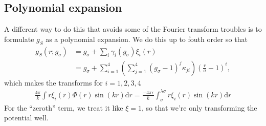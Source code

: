 \documentclass[letterpaper,twocolumn,amsmath,amssymb,pre,aps,10pt]{revtex4-1}
\newcommand\dd{\mathrm{d}}
\begin{document}
\subsection{Polynomial expansion}

A different way to do this that avoids some of the Fourier transform
troubles is to formulate $g_S$ as a polynomial expansion.  We do this
up to fouth order so that
\begin{align}
  g_S(r;g_\sigma) &= g_\sigma + \sum_i \gamma_i(g_\sigma) \xi_i(r) \\
  &=
  g_\sigma + \sum_{i=1}^{4} \left(\sum_{j=1}^{4} (g_\sigma
  - 1)^j \kappa_{ji} \right)
  \left(\frac{r}{\sigma}-1\right)^i,
  \label{eq:fit-form}
\end{align}
which makes the transforms for $i=1,2,3,4$
\begin{align}
 \frac {4\pi}{k}\int r \xi_i(r) \Phi(r) \sin (kr) \dd r =  \frac
       {-4\pi\epsilon}{k}\int_\sigma^{\lambda \sigma} r \xi_i(r)\sin (kr) \dd r
\end{align}
For the ``zeroth'' term, we treat it like $\xi=1$, so that we're only
transforming the potential well.
\end{document}
